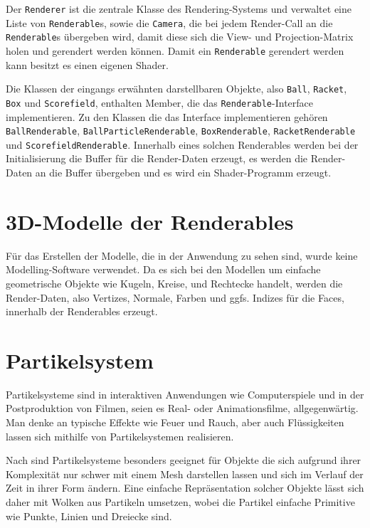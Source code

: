 Der {\texttt{Renderer}} ist die zentrale Klasse des Rendering-Systems und verwaltet eine Liste von {\texttt{Renderable}}s, sowie die {\texttt{Camera}}, die bei jedem Render-Call an die {\texttt{Renderable}}s übergeben wird, damit diese sich die View- und Projection-Matrix holen und gerendert werden können. Damit ein {\texttt{Renderable}} gerendert werden kann besitzt es einen eigenen Shader.

Die Klassen der eingangs erwähnten darstellbaren Objekte, also {\texttt{Ball}}, {\texttt{Racket}}, {\texttt{Box}} und {\texttt{Scorefield}}, enthalten Member, die das {\texttt{Renderable}}-Interface implementieren. Zu den Klassen die das Interface implementieren gehören {\texttt{BallRenderable}}, {\texttt{BallParticleRenderable}},
{\texttt{BoxRenderable}}, {\texttt{RacketRenderable}} und {\texttt{ScorefieldRenderable}}. Innerhalb eines solchen Renderables werden bei der Initialisierung die Buffer für die Render-Daten erzeugt, es werden die Render-Daten an die Buffer übergeben und es wird ein Shader-Programm erzeugt. 

\section{3D-Modelle der Renderables}
%
Für das Erstellen der Modelle, die in der Anwendung zu sehen sind, wurde keine Modelling-Software verwendet. Da es sich bei den Modellen um einfache geometrische Objekte wie Kugeln, Kreise, und Rechtecke handelt, werden die Render-Daten, also Vertizes, Normale, Farben und ggfs. Indizes für die Faces, innerhalb der Renderables erzeugt.

\section{Partikelsystem}
\label{Kapitel_2_-_Unterkapitel_2}
%
Partikelsysteme sind in interaktiven Anwendungen wie Computerspiele und in der Postproduktion von Filmen, seien es Real- oder Animationsfilme, allgegenwärtig.
Man denke an typische Effekte wie Feuer und Rauch, aber auch Flüssigkeiten lassen sich mithilfe von Partikelsystemen realisieren.

Nach \cite{reeves:particle_systems} sind Partikelsysteme besonders geeignet für Objekte die sich aufgrund ihrer Komplexität nur schwer mit einem Mesh darstellen lassen und sich im Verlauf der Zeit in ihrer Form ändern. Eine einfache Repräsentation solcher Objekte lässt sich daher mit Wolken aus Partikeln umsetzen, wobei die Partikel einfache Primitive wie Punkte, Linien und Dreiecke sind\cite{reeves:particle_systems}.

